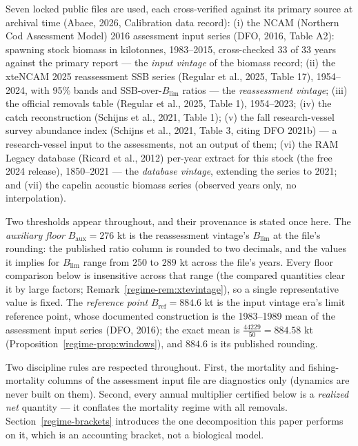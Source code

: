 Seven locked public files are used, each cross-verified against its
primary source at archival time (Abaee, 2026, Calibration data record): (i) the NCAM (Northern Cod Assessment Model) 2016
assessment input series (DFO, 2016, Table A2): spawning stock biomass
in kilotonnes, 1983--2015, cross-checked 33 of 33 years against the
primary report --- the \emph{input vintage} of the biomass record;
(ii) the xteNCAM 2025 reassessment SSB series (Regular et al., 2025,
Table 17), 1954--2024, with 95\% bands and SSB-over-\(B_{\mathrm{lim}}\)
ratios --- the \emph{reassessment vintage}; (iii) the official
removals table (Regular et al., 2025, Table 1), 1954--2023; (iv) the
catch reconstruction (Schijns et al., 2021, Table 1); (v) the fall
research-vessel survey abundance index (Schijns et al., 2021, Table 3,
citing DFO 2021b) --- a research-vessel input to the assessments, not
an output of them; (vi) the RAM Legacy database (Ricard et al., 2012)
per-year extract for this stock (the free 2024 release), 1850--2021 --- the \emph{database
vintage}, extending the series to 2021; and (vii) the capelin acoustic
biomass series (observed years only, no interpolation).

Two thresholds appear throughout, and their provenance is stated once
here. The \emph{auxiliary floor} \(B_{\mathrm{aux}} = 276\) kt is the
reassessment vintage's \(B_{\mathrm{lim}}\) at the file's rounding: the
published ratio column is rounded to two decimals, and the values it
implies for \(B_{\mathrm{lim}}\) range from \(250\) to \(289\) kt
across the file's years. Every floor comparison below is insensitive
across that range (the compared quantities clear it by large factors;
Remark~\ref{regime-rem:xtevintage}), so a single representative value is
fixed. The \emph{reference point} \(B_{\mathrm{ref}} = 884.6\) kt is
the input vintage era's limit reference point, whose documented
construction is the 1983--1989 mean of the assessment input series
(DFO, 2016); the exact mean is
\(\tfrac{44229}{50} = 884.58\) kt (Proposition~\ref{regime-prop:windows}),
and \(884.6\) is its published rounding.

Two discipline rules are respected throughout. First, the mortality
and fishing-mortality columns of the assessment input file are
diagnostics only (dynamics are never built on them). Second, every
annual multiplier certified below is a \emph{realized net} quantity ---
it conflates the mortality regime with all removals. Section~\ref{regime-brackets}
introduces the one decomposition this paper performs on it, which is
an accounting bracket, not a biological model.

